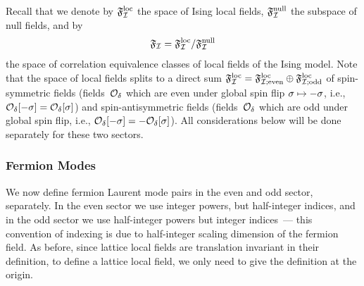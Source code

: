 \documentclass[12pt,oneside,english]{amsart}
\numberwithin{equation}{section}
\numberwithin{figure}{section}
\theoremstyle{plain}
\theoremstyle{plain}
\theoremstyle{plain}
\theoremstyle{plain}
\theoremstyle{remark}
\theoremstyle{definition}
\theoremstyle{plain}
\theoremstyle{plain}
\numberwithin{thm}{section}
\newcommand{\kallemod}[1]{{\color{kallecol} {#1}}}
\begin{document}
Recall that we denote by
$\mathfrak{F}^\mathrm{loc}_{\mathcal{I}}$ the space of Ising local fields,
$\mathfrak{F}^\mathrm{null}_{\mathcal{I}}$ the subspace of
null fields, and by
\[ \mathfrak{F}_{\mathcal{I}} = 
\mathfrak{F}^\mathrm{loc}_{\mathcal{I}} / \mathfrak{F}^\mathrm{null}_{\mathcal{I}} \]
the space of correlation equivalence classes of local fields of the Ising model.
Note that the space of local fields splits to a direct sum
$\mathfrak{F}^\mathrm{loc}_{\mathcal{I}} = \mathfrak{F}^\mathrm{loc}_{\mathcal{I}; \mathrm{even}} \oplus \mathfrak{F}^\mathrm{loc}_{\mathcal{I}; \mathrm{odd}}$
of spin-symmetric fields
(fields~${\mathcal{O}}_{{\delta}}$ which are even under global spin flip
${\sigma} \mapsto -{\sigma}$,
i.e., ${\mathcal{O}}_{{\delta}} [-{\sigma}] = {\mathcal{O}}_{{\delta}}[{\sigma}]$)
and spin-antisymmetric fields (fields~${\mathcal{O}}_{{\delta}}$ which are odd under 
global spin flip,
i.e., ${\mathcal{O}}_{{\delta}} [-{\sigma}] = - {\mathcal{O}}_{{\delta}}[{\sigma}]$).
All considerations below will be done separately for these two sectors.



\subsubsection{Fermion Modes}
We now define fermion Laurent mode pairs in the even and odd sector, separately.
In the even sector we use integer powers, but half-integer indices, and in the 
odd sector we use half-integer powers but integer indices~--- this convention 
of indexing is due to half-integer scaling dimension of the fermion field.
As before, since lattice local fields are translation invariant in
their definition, to define a lattice local field, we only need to
give the definition
at the origin. 
\end{document}
